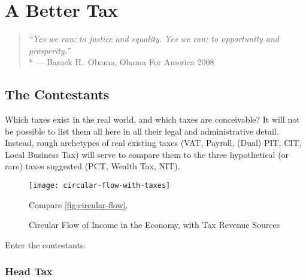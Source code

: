 
\chapter[Better Tax]{A Better Tax} \label{chap:better-tax}


\begin{quote}
	\emph{``Yes we can:
	to justice and equality.
	Yes we can:
	to opportunity and prosperity.''}
	\\*
	--- Barack H.\ Obama, Obama For America 2008
\end{quote}

\section{The Contestants} \label{sec:contestants} Which taxes exist in the real world, and which taxes are conceivable?
It will not be possible to list them all here in all their legal and administrative detail.
Instead, rough archetypes of real existing taxes (VAT, Payroll, (Dual) PIT, CIT, Local Business Tax) will serve to compare them to the three hypothetical (or rare) taxes suggested (PCT, Wealth Tax, NIT).



\begin{figure}[htbp]
	\centering
	\texttt{[image: circular-flow-with-taxes]}
	\caption[Circular Flow in the Economy, with Taxes]{Circular Flow of Income in the Economy, with Tax Revenue Sources}
	\begin{flushleft}
		\scriptsize{Compare \autoref{fig:circular-flow}.}
		
	\end{flushleft}
	\label{fig:circular-flow-with-taxes}
\end{figure}

Enter the contestants.

\subsection{Head Tax}

